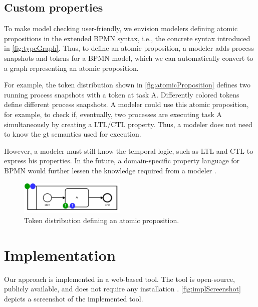 \documentclass[runningheads]{llncs}
\begin{document}
\subsection{Custom properties} \label{subsec:customProperties}
To make model checking user-friendly, we envision modelers defining atomic propositions in the extended BPMN syntax, i.e., the concrete syntax introduced in \autoref{fig:typeGraph}.
Thus, to define an atomic proposition, a modeler adds process snapshots and tokens for a BPMN model, which we can automatically convert to a graph representing an atomic proposition.

For example, the token distribution shown in \autoref{fig:atomicProposition} defines two running process snapshots with a token at task A.
Differently colored tokens define different process snapshots.
A modeler could use this atomic proposition, for example, to check if, eventually, two processes are executing task A simultaneously by creating a LTL/CTL property.
Thus, a modeler does not need to know the \gls*{gt} semantics used for execution.

However, a modeler must still know the temporal logic, such as LTL and CTL to express his properties.
In the future, a domain-specific property language for BPMN would further lessen the knowledge required from a modeler \cite{meyersProMoBoxFrameworkGenerating2014}. 


\begin{figure}[ht]
    \centering
    \includegraphics[width=0.45\textwidth]{images/bpmn_semantics-atomic-proposition.pdf}
    \caption{Token distribution defining an atomic proposition.}
    \label{fig:atomicProposition}
\end{figure}


\section{Implementation} \label{sec:impl}

Our approach is implemented in a web-based tool.
The tool is open-source, publicly available, and does not require any installation \cite{krauterArtifactsICGT2023}.
\autoref{fig:implScreenshot} depicts a screenshot of the implemented tool.
\end{document}
